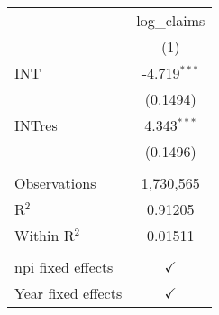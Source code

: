 
\begingroup
\centering
\begin{tabular}{lc}
   \toprule
                      & log\_claims\\   
                      & (1)\\  
   \midrule 
   INT                & -4.719$^{***}$\\   
                      & (0.1494)\\   
   INTres             & 4.343$^{***}$\\   
                      & (0.1496)\\   
    \\
   Observations       & 1,730,565\\  
   R$^2$              & 0.91205\\  
   Within R$^2$       & 0.01511\\  
    \\
   npi fixed effects  & $\checkmark$\\   
   Year fixed effects & $\checkmark$\\   
   \bottomrule
\end{tabular}
\par\endgroup



